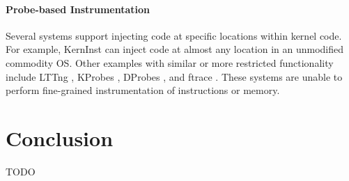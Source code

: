 \documentclass[preprint]{sigplanconf}
\begin{document}
\paragraph{Probe-based Instrumentation} Several systems support injecting code at specific locations within kernel code. For example, KernInst \cite{KernInst} can inject code at almost any location in an unmodified commodity OS. Other examples with similar or more restricted functionality include LTTng \cite{LTTng}, KProbes \cite{KProbes}, DProbes \cite{DProbes}, and ftrace \cite{ftrace}. These systems are unable to perform fine-grained instrumentation of instructions or memory.


%

\section{Conclusion}\label{sec:conclusion}
TODO






\end{document}

